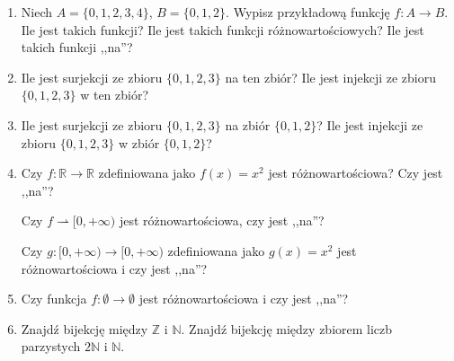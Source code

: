 \documentclass[12pt]{article}
\newcommand{\isfunc}[3]{{{#1}\colon{#2}\rightarrow{#3}}}
\newcommand{\bN}{\mathbb{N}}
\newcommand{\bbZ}{\mathbb{Z}}
\newcommand{\bR}{\mathbb{R}}
\begin{document}
\begin{enumerate}
\item Niech $A=\{0,1,2,3,4\}$, $B=\{0,1,2\}$.
Wypisz przykładową funkcję $\isfunc{f}{A}{B}$.
Ile jest takich funkcji? Ile jest takich funkcji różnowartościowych?
Ile jest takich funkcji ,,na''? 

\item 
Ile jest surjekcji ze zbioru $\{0,1,2,3\}$ na ten zbiór?
Ile jest injekcji ze zbioru $\{0,1,2,3\}$ w ten zbiór?

\item 
Ile jest surjekcji ze zbioru $\{0,1,2,3\}$ na zbiór $\{0,1,2\}$?
Ile jest injekcji ze zbioru $\{0,1,2,3\}$ w zbiór $\{0,1,2\}$?

\item 
Czy $\isfunc{f}{\bR}{\bR}$ zdefiniowana jako $f(x)=x^2$ 
jest różnowartościowa? Czy jest ,,na''?

Czy $f\rightharpoonup [0,+\infty)$ jest różnowartościowa, czy jest ,,na''?

Czy $\isfunc{g}{[0,+\infty)}{[0,+\infty)}$ zdefiniowana jako 
$g(x)=x^2$ jest różnowartościowa i czy jest ,,na''?

\item 
Czy funkcja $\isfunc{f}{\emptyset}{\emptyset}$ jest różnowartościowa
i czy jest ,,na''?

\item 
Znajdź bijekcję między $\bbZ$ i $\bN$.
Znajdź bijekcję między zbiorem liczb parzystych $2\bN$ i $\bN$.

\end{enumerate}
\end{document}

